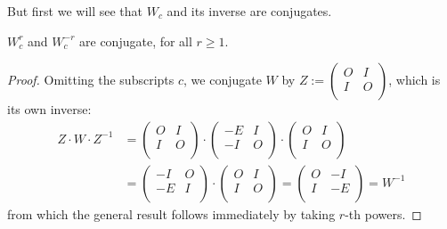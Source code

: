 But first we will see that $W_{c}$ and its inverse are conjugates.
\begin{lemma}
  $W_{c}^r$ and $W_{c}^{-r}$ are conjugate, for all $r\geq 1$.
\end{lemma}

\begin{proof}
  Omitting the subscripts $c$, we conjugate $W$ by
  $Z := \left(\begin{smallmatrix} O & I \\ I & O \\\end{smallmatrix}\right)$,
  which is its own inverse:
  \[
  \begin{aligned}
  Z \cdot W \cdot Z^{-1}
  & =
  \left(
  \begin{array}{cc}
    O & I \\
    I & O \\
  \end{array}
  \right)
  \cdot
  \left(
  \begin{array}{cc}
    -E & I \\
    -I & O \\
  \end{array}
  \right)
  \cdot
  \left(
  \begin{array}{cc}
    O & I \\
    I & O \\
  \end{array}
  \right)\\
  & =
  \left(
  \begin{array}{cc}
    -I & O \\
    -E & I \\
  \end{array}
  \right)
  \cdot
  \left(
  \begin{array}{cc}
    O & I \\
    I & O \\
  \end{array}
  \right) 
   =
  \left(
  \begin{array}{cc}
    O & -I \\
    I & -E \\
  \end{array}
  \right) 
   =
  W^{-1}
  \end{aligned}
  \]
from which the general result follows immediately by taking $r$-th powers.
\end{proof}

